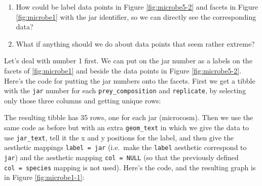 \documentclass[]{book}
\newenvironment{Shaded}{\begin{snugshade}}{\end{snugshade}}
\newcommand{\DataTypeTok}[1]{\textcolor[rgb]{0.13,0.29,0.53}{#1}}
\newcommand{\DecValTok}[1]{\textcolor[rgb]{0.00,0.00,0.81}{#1}}
\newcommand{\FloatTok}[1]{\textcolor[rgb]{0.00,0.00,0.81}{#1}}
\newcommand{\KeywordTok}[1]{\textcolor[rgb]{0.13,0.29,0.53}{\textbf{#1}}}
\newcommand{\NormalTok}[1]{#1}
\newcommand{\OperatorTok}[1]{\textcolor[rgb]{0.81,0.36,0.00}{\textbf{#1}}}
\newcommand{\OtherTok}[1]{\textcolor[rgb]{0.56,0.35,0.01}{#1}}
\newcommand{\StringTok}[1]{\textcolor[rgb]{0.31,0.60,0.02}{#1}}
\begin{document}
\begin{enumerate}
\def\labelenumi{\arabic{enumi}.}
\item
  How could be label data points in Figure \ref{fig:microbe5-2} and facets in Figure \ref{fig:microbe1} with the jar identifier, so we can directly see the corresponding data?
\item
  What if anything should we do about data points that seem rather extreme?
\end{enumerate}

Let's deal with number 1 first. We can put on the jar number as a labels on the facets of \ref{fig:microbe1} and beside the data points in Figure \ref{fig:microbe5-2}. Here's the code for putting the jar numbers onto the facets. First we get a tibble with the \texttt{jar} number for each \texttt{prey\_composition} and \texttt{replicate}, by selecting only those three columns and getting unique rows:

\begin{Shaded}
\end{Shaded}

The resulting tibble has 35 rows, one for each jar (microcosm). Then we use the same code as before but with an extra \texttt{geom\_text} in which we give the data to use \texttt{jar\_text}, tell it the x and y positions for the label, and then give the aesthetic mappings \texttt{label\ =\ jar} (i.e.~make the \texttt{label} aesthetic correspond to \texttt{jar}) and the aesthetic mapping \texttt{col\ =\ NULL} (so that the previously defined \texttt{col\ =\ species} mapping is not used). Here's the code, and the resulting graph is in Figure \ref{fig:microbe1-1}:

\begin{Shaded}
\end{Shaded}
\end{document}
